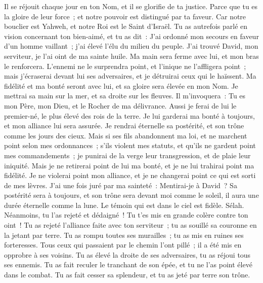 \begin{multicols}{2}
Il se réjouit chaque jour en ton Nom, et il se glorifie de ta justice.
Parce que tu es la gloire de leur force~; et notre pouvoir est distingué par ta faveur.
Car notre bouclier est Yahweh, et notre Roi est le Saint d'Israël.
Tu as autrefois parlé en vision concernant ton bien-aimé, et tu as dit~: J'ai ordonné mon secours en faveur d'un homme vaillant~; j'ai élevé l'élu du milieu du peuple.
J'ai trouvé David, mon serviteur, je l'ai oint de ma sainte huile.
Ma main sera ferme avec lui, et mon bras le renforcera.
L'ennemi ne le surprendra point, et l'inique ne l'affligera point~;
mais j'écraserai devant lui ses adversaires, et je détruirai ceux qui le haïssent.
Ma fidélité et ma bonté seront avec lui, et sa gloire sera élevée en mon Nom.
Je mettrai sa main sur la mer, et sa droite sur les fleuves.
Il m'invoquera~: Tu es mon Père, mon Dieu, et le Rocher de ma délivrance.
Aussi je ferai de lui le premier-né, le plus élevé des rois de la terre.
Je lui garderai ma bonté à toujours, et mon alliance lui sera assurée.
Je rendrai éternelle sa postérité, et son trône comme les jours des cieux.
Mais si ses fils abandonnent ma loi, et ne marchent point selon mes ordonnances~;
s'ils violent mes statuts, et qu'ils ne gardent point mes commandements~;
je punirai de la verge leur transgression, et de plaie leur iniquité.
Mais je ne retirerai point de lui ma bonté, et je ne lui trahirai point ma fidélité.
Je ne violerai point mon alliance, et je ne changerai point ce qui est sorti de mes lèvres.
J'ai une fois juré par ma sainteté~: Mentirai-je à David~?
Sa postérité sera à toujours, et son trône sera devant moi comme le soleil,
il aura une durée éternelle comme la lune. Le témoin qui est dans le ciel est fidèle. Sélah.
Néanmoins, tu l'as rejeté et dédaigné~! Tu t'es mis en grande colère contre ton oint~!
Tu as rejeté l'alliance faite avec ton serviteur~; tu as souillé sa couronne en la jetant par terre.
Tu as rompu toutes ses murailles~; tu as mis en ruines ses forteresses.
Tous ceux qui passaient par le chemin l'ont pillé~; il a été mis en opprobre à ses voisins.
Tu as élevé la droite de ses adversaires, tu as réjoui tous ses ennemis.
Tu as fait reculer le tranchant de son épée, et tu ne l'as point élevé dans le combat.
Tu as fait cesser sa splendeur, et tu as jeté par terre son trône.

\end{multicols}
